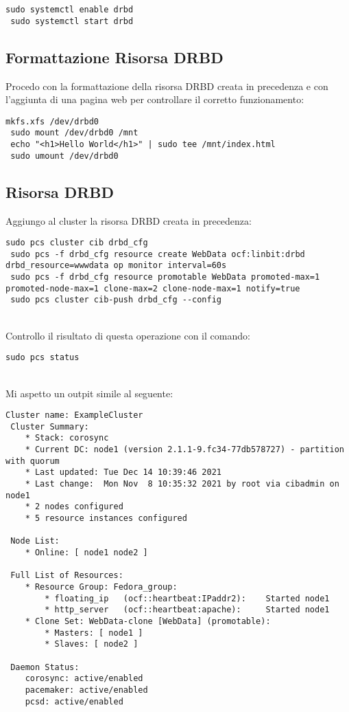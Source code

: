 \begin{lstlisting}[style=cmd]
 sudo systemctl enable drbd
 sudo systemctl start drbd
\end{lstlisting}

\subsection{Formattazione Risorsa DRBD}

Procedo con la formattazione della risorsa DRBD creata in precedenza e con l'aggiunta di una pagina web per controllare il corretto funzionamento:

\begin{lstlisting}[style=cmd]
 mkfs.xfs /dev/drbd0
 sudo mount /dev/drbd0 /mnt
 echo "<h1>Hello World</h1>" | sudo tee /mnt/index.html
 sudo umount /dev/drbd0
\end{lstlisting}

\subsection{Risorsa DRBD}

Aggiungo al cluster la risorsa DRBD creata in precedenza:

\begin{lstlisting}[style=cmd]
 sudo pcs cluster cib drbd_cfg
 sudo pcs -f drbd_cfg resource create WebData ocf:linbit:drbd drbd_resource=wwwdata op monitor interval=60s
 sudo pcs -f drbd_cfg resource promotable WebData promoted-max=1 promoted-node-max=1 clone-max=2 clone-node-max=1 notify=true
 sudo pcs cluster cib-push drbd_cfg --config
\end{lstlisting}
\ \\
Controllo il risultato di questa operazione con il comando:

\begin{lstlisting}[style=cmd]
 sudo pcs status
\end{lstlisting}
\ \\
Mi aspetto un outpit simile al seguente:

\begin{lstlisting}[style=output]
 Cluster name: ExampleCluster
 Cluster Summary:
    * Stack: corosync
    * Current DC: node1 (version 2.1.1-9.fc34-77db578727) - partition with quorum
    * Last updated: Tue Dec 14 10:39:46 2021
    * Last change:  Mon Nov  8 10:35:32 2021 by root via cibadmin on node1
    * 2 nodes configured
    * 5 resource instances configured

 Node List:
    * Online: [ node1 node2 ]

 Full List of Resources:
    * Resource Group: Fedora_group:
        * floating_ip	(ocf::heartbeat:IPaddr2):	 Started node1
        * http_server	(ocf::heartbeat:apache):	 Started node1
    * Clone Set: WebData-clone [WebData] (promotable):
        * Masters: [ node1 ]
        * Slaves: [ node2 ]

 Daemon Status:
    corosync: active/enabled
    pacemaker: active/enabled
    pcsd: active/enabled

\end{lstlisting}

